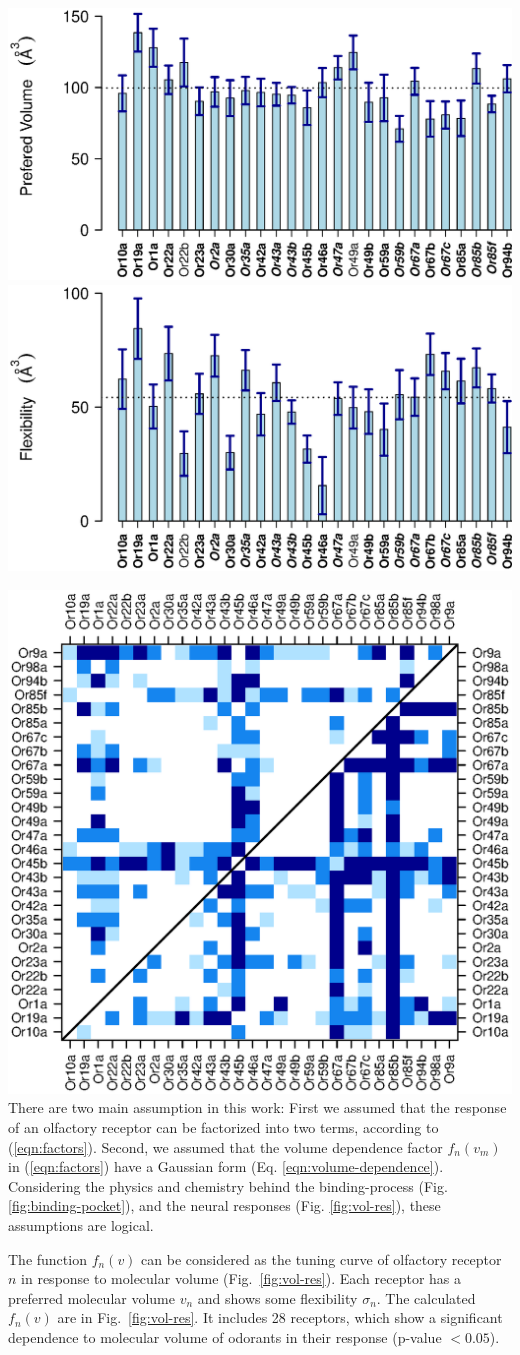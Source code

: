 \documentclass[landscape,a1paper,fontscale=0.6]{baposter} %
\newcommand{\numberofreceptors}{ 28 }
\begin{document}
\begin{poster}
{		\centering
		\includegraphics[width=  0.2 \textwidth]{fig/mean-vol}
		\includegraphics[width=  0.2 \textwidth]{fig/std-vol}

	\centering
	\includegraphics[width= 0.2 \textwidth]{fig/pair-pval}
There are two main assumption in this work: 
First we assumed that the response of an olfactory receptor can be factorized into two terms, 
according to (\ref{eqn:factors}).
Second, we assumed that the volume dependence factor $f_n(v_m)$ in (\ref{eqn:factors}) 
have a Gaussian form (Eq. \ref{eqn:volume-dependence}).
Considering the physics and chemistry behind the binding-process (Fig. \ref{fig:binding-pocket}), 
and the neural responses (Fig. \ref{fig:vol-res}), 
these assumptions are logical. 


The function $f_n(v)$ can be considered as the tuning curve of olfactory receptor $n$ in response to molecular volume (Fig.~\ref{fig:vol-res}). 
Each receptor has a preferred molecular volume $v_n$ and shows some flexibility $\sigma_n$. 
The calculated $f_n(v)$ are in  Fig.~\ref{fig:vol-res}. 
It includes \numberofreceptors receptors, 
which show a significant dependence to molecular volume of odorants in their response (p-value $<0.05$).

}
\end{poster}
\end{document}
